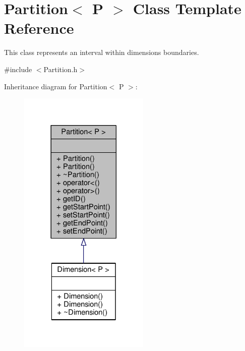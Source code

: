 \hypertarget{classPartition}{}\section{Partition$<$ P $>$ Class Template Reference}
\label{classPartition}


This class represents an interval within dimension\textquotesingle{}s boundaries.  




{\ttfamily \#include $<$Partition.\+h$>$}



Inheritance diagram for Partition$<$ P $>$\+:
\nopagebreak
\begin{figure}[H]
\begin{center}
\leavevmode
\includegraphics[width=177pt]{classPartition__inherit__graph}
\end{center}
\end{figure}


